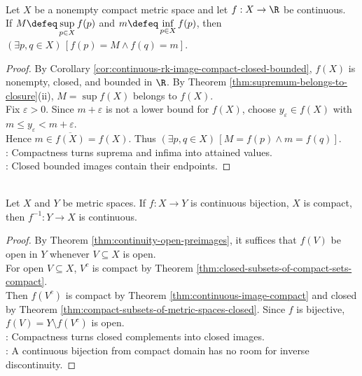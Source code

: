 \begin{theorem} \label{thm:extreme-value-theorem-compact} \\
Let $X$ be a nonempty compact metric space and let $f:X\to\R$ be continuous.\\
If $M\defeq\sup\limits_{p\in X}f(p)$ and $m\defeq\inf\limits_{p\in X}f(p)$, then $(\exists p,q\in X)\,[f(p)=M\land f(q)=m]$.
\begin{proof}
By Corollary \ref{cor:continuous-rk-image-compact-closed-bounded}, $f(X)$ is nonempty, closed, and bounded in $\R$. By Theorem \ref{thm:supremum-belongs-to-closure}(ii), $M=\sup f(X)$ belongs to $f(X)$.\\
Fix $\varepsilon>0$. Since $m+\varepsilon$ is not a lower bound for $f(X)$, choose $y_\varepsilon\in f(X)$ with $m\leq y_\varepsilon<m+\varepsilon$.\\
Hence $m\in\overline{f(X)}=f(X)$. Thus $(\exists p,q\in X)\,[M=f(p)\land m=f(q)]$.\\
: Compactness turns suprema and infima into attained values.\\
: Closed bounded images contain their endpoints.
\end{proof}
\end{theorem}

\begin{theorem} \label{thm:compact-bijection-has-continuous-inverse} \\
Let $X$ and $Y$ be metric spaces. If $f:X\to Y$ is continuous bijection, $X$ is compact, then $f^{-1}:Y\to X$ is continuous.
\begin{proof}
By Theorem \ref{thm:continuity-open-preimages}, it suffices that $f(V)$ be open in $Y$ whenever $V\subseteq X$ is open.\\
For open $V\subseteq X$, $V^c$ is compact by Theorem \ref{thm:closed-subsets-of-compact-sets-compact}.\\
Then $f(V^c)$ is compact by Theorem \ref{thm:continuous-image-compact} and closed by Theorem \ref{thm:compact-subsets-of-metric-spaces-closed}. Since $f$ is bijective, $f(V)=Y\setminus f(V^c)$ is open.\\
: Compactness turns closed complements into closed images.\\
: A continuous bijection from compact domain has no room for inverse discontinuity.
\end{proof}
\end{theorem}

